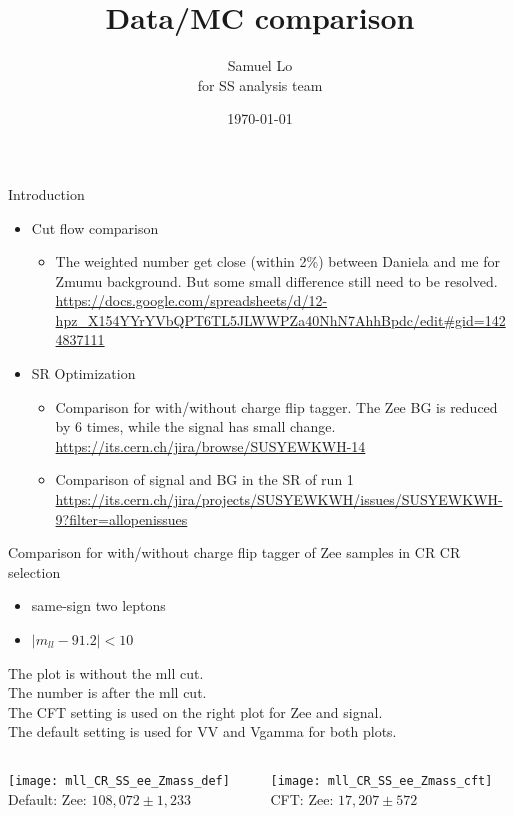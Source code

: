 \documentclass[mathserif,serif]{beamer}
\title[]{Data/MC comparison}
\author[]
{
Samuel Lo \inst{1} \\
for SS analysis team
}
\institute[]
{
\inst{1}
The University of Hong Kong
}
\date[]{\today}
\begin{document}
\frame{\titlepage}

\begin{frame}{Introduction}
\begin{itemize}
\item Cut flow comparison
\begin{itemize}
\item The weighted number get close (within 2\%) between Daniela and me for Zmumu background. But some small difference still need to be resolved.
\url{https://docs.google.com/spreadsheets/d/12-hpz\_X154YYrYVbQPT6TL5JLWWPZa40NhN7AhhBpdc/edit\#gid=1424837111}
\end{itemize}
\item SR Optimization
\begin{itemize}
\item Comparison for with/without charge flip tagger. The Zee BG is reduced by 6 times, while the signal has small change.
\url{https://its.cern.ch/jira/browse/SUSYEWKWH-14}
\item Comparison of signal and BG in the SR of run 1
\url{https://its.cern.ch/jira/projects/SUSYEWKWH/issues/SUSYEWKWH-9?filter=allopenissues}
\end{itemize}
\end{itemize}
\end{frame}

\begin{frame}{Comparison for with/without charge flip tagger of Zee samples in CR}
CR selection
\begin{itemize}
\item same-sign two leptons
\item $|m_{ll} - 91.2| < 10$
\end{itemize}
The plot is without the mll cut. \\
The number is after the mll cut. \\
The CFT setting is used on the right plot for Zee and signal. \\
The default setting is used for VV and Vgamma for both plots. \\

\begin{columns}

\begin{column}{0.5\textwidth}
\begin{center}
\texttt{[image: mll\_CR\_SS\_ee\_Zmass\_def]} \\
Default: Zee: $108,072\pm1,233$
\end{center}
\end{column}

\begin{column}{0.5\textwidth}
\begin{center}
\texttt{[image: mll\_CR\_SS\_ee\_Zmass\_cft]} \\
CFT: Zee: $17,207\pm572$
\end{center}
\end{column}

\end{columns}

\end{frame}
\end{document}
